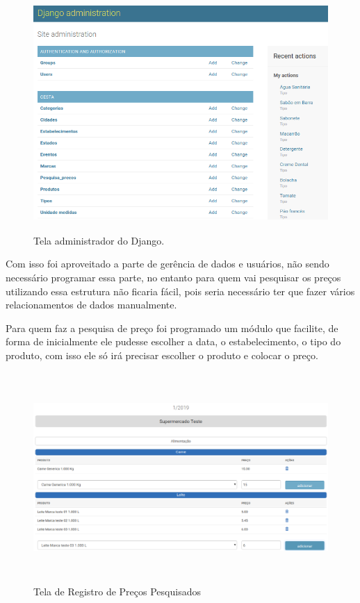 \documentclass{ifto-tex}
\begin{document}
	\begin{figure}[H]
	\begin{center}
		\includegraphics[width=16.0cm, height= 9.0cm]{cestaadmin.png}    %
		\caption{Tela administrador do Django.} 
		\label{fig:faces}
	\end{center}
\end{figure}
Com isso foi aproveitado a parte de gerência de dados e usuários, não sendo necessário programar essa parte, no entanto para quem vai pesquisar os preços utilizando essa estrutura não ficaria fácil, pois seria necessário ter que fazer vários relacionamentos de dados manualmente.

Para quem faz a pesquisa de preço foi programado um módulo que facilite, de forma de inicialmente ele pudesse escolher a data, o estabelecimento, o tipo do produto, com isso ele só irá precisar escolher o produto e colocar o preço.

	\begin{figure}[H]
	\begin{center}
		\includegraphics[width=16.0cm, height= 8.0cm]{cestacadastro.png}    %
		\caption{Tela de Registro de Preços Pesquisados} 
		\label{fig:faces}
	\end{center}
\end{figure}
\end{document}
